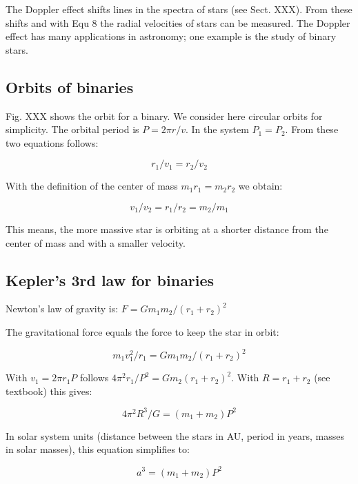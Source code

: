 The Doppler effect shifts lines in the spectra of stars (see Sect. XXX). From these shifts and with Equ 8 the radial velocities of stars can be measured. The Doppler effect has many applications in astronomy; one example is the study of binary stars.

\subsection{Orbits of binaries}

Fig. XXX shows the orbit for a binary. We consider here circular orbits for simplicity. The orbital period is $P = 2 \pi r / v$. In the system $P_1 = P_2$. From these two equations follows:

\begin{equation}
r_1 / v_1 = r_2 / v_2
\end{equation}

With the definition of the center of mass $m_1 r_1 = m_2 r_2$ we obtain:

\begin{equation}
v_1 / v_2 = r_1 / r_2 = m_2 / m_1
\end{equation}

This means, the more massive star is orbiting at a shorter distance from the center of mass and with a smaller velocity.

\subsection{Kepler's 3rd law for binaries}

Newton's law of gravity is: $F = G m_1 m_2 / (r_1 + r_2)^2$

The gravitational force equals the force to keep the star in orbit: 

\begin{equation}
m_1 v_1^2 / r_1 = G m_1 m_2 / (r_1 + r_2)^2
\end{equation}

With $v_1 = 2 \pi r_1 P$ follows $4 \pi^2 r_1 / P^2 = G m_2 (r_1 + r_2)^2$. With $R = r_1 + r_2$ (see textbook) this gives:

\begin{equation}
4 \pi^2 R^3 / G = (m_1 + m_2) P^2
\end{equation}

In solar system units (distance between the stars in AU, period in years, masses in solar masses), this equation simplifies to:

\begin{equation}
a^3 = (m_1 + m_2) P^2
\end{equation}

